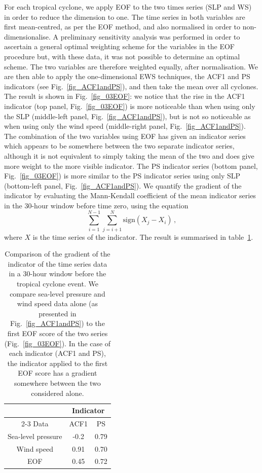 \documentclass[%
aip,
amsmath,amssymb,
reprint,%
]{revtex4-1}
\newcommand{\noteRed}[1]{{#1}}
\begin{document}
For each tropical cyclone, we apply EOF to the two times series (SLP and WS) in order to reduce the dimension to one. The time series in both variables are first mean-centred, as per the EOF method, and also normalised in order to non-dimensionalise. {\noteRed A preliminary sensitivity analysis was performed in order to ascertain a general optimal weighting scheme for the variables in the EOF procedure but, with these data, it was not possible to determine an optimal scheme. The two variables are therefore weighted equally, after normalisation.} We are then able to apply the one-dimensional EWS techniques, the ACF1 and PS indicators \cite{prettyman2018} (see Fig.~\ref{fig_ACF1andPS}), and then take the mean over all cyclones. The result is shown in Fig.~\ref{fig_03EOF}: we notice that the rise in the ACF1 indicator (top panel, Fig.~\ref{fig_03EOF}) is more noticeable than when using only the SLP (middle-left panel, Fig.~\ref{fig_ACF1andPS}), but is not so noticeable as when using only the wind speed (middle-right panel, Fig.~\ref{fig_ACF1andPS}). The combination of the two variables using EOF has given an indicator series which appears to be somewhere between the two separate indicator series, although it is not equivalent to simply taking the mean of the two and does give more weight to the more visible indicator. The PS indicator series (bottom panel, Fig.~\ref{fig_03EOF}) is more similar to the PS indicator series using only SLP (bottom-left panel, Fig.~\ref{fig_ACF1andPS}). We quantify the gradient of the indicator by evaluating the Mann-Kendall coefficient of the mean indicator series in the 30-hour window before time zero, using the equation
\begin{equation}
\sum_{i=1}^{N-1}\sum_{j=i+1}^{N}\text{sign}(X_j-X_i)\,,
\label{eqn_MK}
\end{equation} 
where $X$ is the time series of the indicator. The result is summarised in table~\ref{tab_EOFresults}.

\begin{table}
\centering
\begin{tabular}{ccc}
\hline
& \multicolumn{2}{c}{Indicator} \\
\cline{2-3}
Data & ACF1 & PS\\
\hline
Sea-level pressure & -0.2 & 0.79 \\
Wind speed & 0.91 & 0.70 \\
EOF & 0.45 & 0.72\\
\hline
\end{tabular}

\caption{Comparison of the gradient of the indicator of the time series data in a 30-hour window before the tropical cyclone event. We compare sea-level pressure and wind speed data alone (as presented in Fig.~\ref{fig_ACF1andPS}) to the first EOF score of the two series (Fig.~\ref{fig_03EOF}). In the case of each indicator (ACF1 and PS), the indicator applied to the first EOF score has a gradient somewhere between the two considered alone.}\label{tab_EOFresults}
\end{table}
\end{document}
